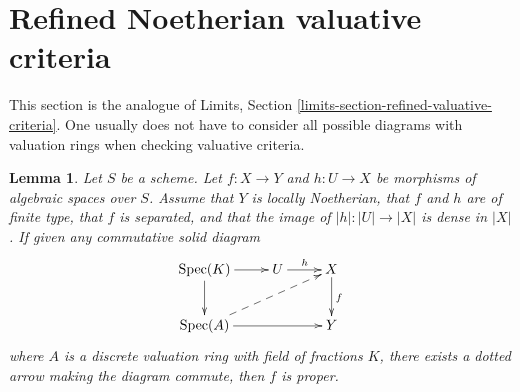 \documentclass{stacks-project}
\theoremstyle{plain}
\newtheorem{lemma}[subsection]{Lemma}
\theoremstyle{definition}
\theoremstyle{remark}
\numberwithin{equation}{subsection}
\def\Spec{\mathop{\mathrm{Spec}}}
\begin{document}
\section{Refined Noetherian valuative criteria}
\label{section-refined-valuative-criteria}

\noindent
This section is the analogue of
Limits, Section \ref{limits-section-refined-valuative-criteria}.
One usually does not have to consider all possible diagrams with
valuation rings when checking valuative criteria.

\begin{lemma}
\label{lemma-refined-valuative-criterion-proper}
Let $S$ be a scheme. Let $f : X \to Y$ and $h : U \to X$ be
morphisms of algebraic spaces over $S$. Assume that $Y$ is
locally Noetherian, that $f$ and $h$ are of finite type,
that $f$ is separated, and that the image of $|h| : |U| \to |X|$
is dense in $|X|$. If given any commutative solid diagram
$$
\xymatrix{
\Spec(K) \ar[r] \ar[d] & U \ar[r]^h & X \ar[d]^f \\
\Spec(A) \ar[rr] \ar@{-->}[rru] & & Y
}
$$
where $A$ is a discrete valuation ring with field of fractions $K$, there
exists a dotted arrow making the diagram commute, then $f$ is proper.
\end{lemma}
\end{document}
